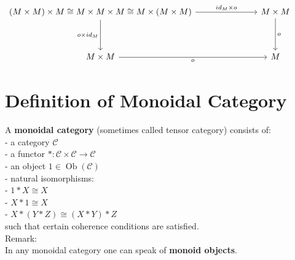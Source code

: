 \documentclass[a4paper, twoside, english, 11pt]{book}
\DeclareMathOperator{\Ob}{Ob}
\newcommand{\C}{\mathcal C}
\begin{document}
$\begin{tikzcd}
(M \times M) \times M \cong M \times M \times M \cong M \times (M \times M) \arrow[dd, "o \times id_M"'] \arrow[rrr, "id_M\times o"] &  &  & M \times M \arrow[dd, "o"] \\
                                                                                                                                     &  &  &                            \\
M \times M \arrow[rrr, "o"']                                                                                                         &  &  & M
\end{tikzcd}$ \\



\section{Definition of Monoidal Category}

A \textbf{monoidal category} (sometimes called tensor category) consists of: \\

- a category $\C$ \\

- a functor $* : \C \times \C \rightarrow \C$ \\

- an object $1 \in \Ob(\C)$ \\ %

- natural isomorphisms: \\

\indent\indent
- $1 * X \cong X$ \\

\indent\indent
- $X * 1 \cong X$ \\

\indent\indent
- $X * (Y * Z) \cong (X * Y) * Z$ \\

\noindent
such that certain coherence conditions are satisfied. \\

\noindent
Remark: \\
In any monoidal category one can speak of \textbf{monoid objects}.
\end{document}
